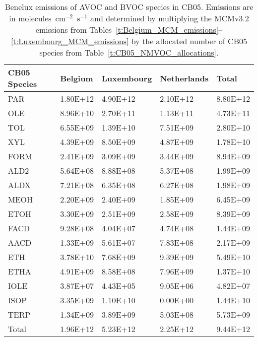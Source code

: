 \footnotesize
\begin{table}
\centering
	\caption{Benelux emissions of AVOC and BVOC species in CB05. Emissions are in molecules~cm$^{-2}$~s$^{-1}$ and determined by multiplying the MCMv3.2 emissions from Tables~\ref{t:Belgium_MCM_emissions}--\ref{t:Luxembourg_MCM_emissions} by the allocated number of CB05 species from Table~\ref{t:CB05_NMVOC_allocations}.}%
\begin{tabular}{lllll}
	\hline \hline
	\textbf{CB05 Species} & \textbf{Belgium} & \textbf{Luxembourg} & \textbf{Netherlands} & \textbf{Total} \\

	\hline
	PAR & 1.80E+12 & 4.90E+12 & 2.10E+12 & 8.80E+12 \\
	OLE & 8.96E+10 & 2.70E+11 & 1.13E+11 & 4.73E+11 \\
	TOL & 6.55E+09 & 1.39E+10 & 7.51E+09 & 2.80E+10 \\
	XYL & 4.39E+09 & 8.50E+09 & 4.87E+09 & 1.78E+10 \\
	FORM & 2.41E+09 & 3.09E+09 & 3.44E+09 & 8.94E+09 \\
	ALD2 & 5.64E+08 & 8.88E+08 & 5.37E+08 & 1.99E+09 \\
	ALDX & 7.21E+08 & 6.35E+08 & 6.27E+08 & 1.98E+09 \\
	MEOH & 2.20E+09 & 2.40E+09 & 1.85E+09 & 6.45E+09 \\
	ETOH & 3.30E+09 & 2.51E+09 & 2.58E+09 & 8.39E+09 \\
	FACD & 9.28E+08 & 4.04E+07 & 4.74E+08 & 1.44E+09 \\
	AACD & 1.33E+09 & 5.61E+07 & 7.83E+08 & 2.17E+09 \\
	ETH & 3.78E+10 & 7.68E+09 & 9.39E+09 & 5.49E+10 \\
	ETHA & 4.91E+09 & 8.58E+08 & 7.96E+09 & 1.37E+10 \\
	IOLE & 3.87E+07 & 4.43E+05 & 9.05E+06 & 4.82E+07 \\
	ISOP & 3.35E+09 & 1.10E+10 & 0.00E+00 & 1.44E+10 \\
	TERP & 1.34E+09 & 3.89E+09 & 5.03E+08 & 5.73E+09 \\
	\hline Total & 1.96E+12 & 5.23E+12 & 2.25E+12 & 9.44E+12 \\
	\hline \hline
\end{tabular}
\label{t:CB05_NMVOC_emissions}
\end{table}